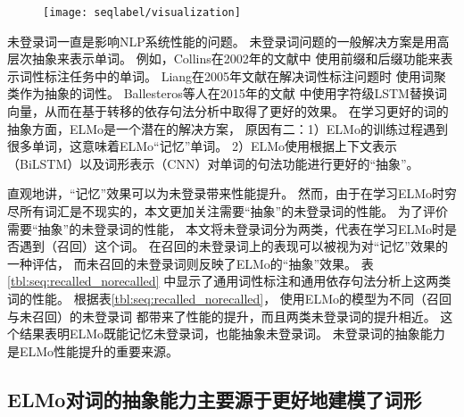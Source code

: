 \begin{figure}[t]
	\centering
	\texttt{[image: seqlabel/visualization]}
\end{figure}

未登录词一直是影响NLP系统性能的问题。
未登录词问题的一般解决方案是用高层次抽象来表示单词。
例如，Collins在2002年的文献中
使用前缀和后缀功能来表示词性标注任务中的单词。 
Liang在2005年文献在解决词性标注问题时
使用词聚类作为抽象的词性。
Ballesteros等人在2015年的文献
中使用字符级LSTM替换词向量，从而在基于转移的依存句法分析中取得了更好的效果。
在学习更好的词的抽象方面，ELMo是一个潜在的解决方案，
原因有二：1）ELMo的训练过程遇到很多单词，这意味着ELMo``记忆''单词。
2）ELMo使用根据上下文表示（BiLSTM）以及词形表示（CNN）对单词的句法功能进行更好的``抽象''。

直观地讲，``记忆''效果可以为未登录带来性能提升。
然而，由于在学习ELMo时穷尽所有词汇是不现实的，本文更加关注需要``抽象''的未登录词的性能。
为了评价需要``抽象''的未登录词的性能，
本文将未登录词分为两类，代表在学习ELMo时是否遇到（召回）这个词。
在召回的未登录词上的表现可以被视为对``记忆''效果的一种评估，
而未召回的未登录词则反映了ELMo的``抽象''效果。
表\ref{tbl:seq:recalled_norecalled}
中显示了通用词性标注和通用依存句法分析上这两类词的性能。
根据表\ref{tbl:seq:recalled_norecalled}，
使用ELMo的模型为不同（召回与未召回）的未登录词
都带来了性能的提升，而且两类未登录词的提升相近。
这个结果表明ELMo既能记忆未登录词，也能抽象未登录词。
未登录词的抽象能力是ELMo性能提升的重要来源。

\subsection{ELMo对词的抽象能力主要源于更好地建模了词形}

